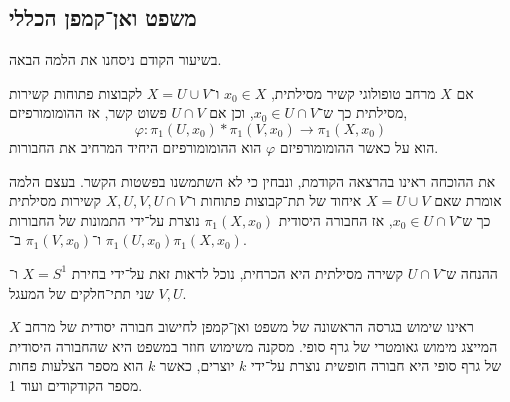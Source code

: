 \subsection{משפט ואן־קמפן הכללי}
בשיעור הקודם ניסחנו את הלמה הבאה.
\begin{lemma}
	אם $X$ מרחב טופולוגי קשיר מסילתית, $x_0 \in X$ ו־$X = U \cup V$ לקבוצות פתוחות קשירות מסילתית כך ש־$x_0 \in U \cap V$, וכן אם $U \cap V$ פשוט קשר, אז ההומומורפיזם,
	\[
		\varphi : \pi_1(U, x_0) * \pi_1(V, x_0) \to \pi_1(X, x_0)
	\]
	הוא על כאשר ההומומורפיזם $\varphi$ הוא ההומומורפיזם היחיד המרחיב את החבורות.
\end{lemma}
את ההוכחה ראינו בהרצאה הקודמת, ונבחין כי לא השתמשנו בפשטות הקשר.
בעצם הלמה אומרת שאם $X = U \cup V$ איחוד של תת־קבוצות פתוחות ו־$X, U, V, U \cap V$ קשירות מסילתית כך ש־$x_0 \in U \cap V$, אז החבורה היסודית $\pi_1(X, x_0)$ נוצרת על־ידי התמונות של החבורות
$\pi_1(U, x_0)$ ו־$\pi_1(V, x_0)$ ב־$\pi_1(X, x_0)$.
\begin{remark}
	ההנחה ש־$U \cap V$ קשירה מסילתית היא הכרחית, נוכל לראות זאת על־ידי בחירת $X = S^1$ ו־$V, U$ שני תתי־חלקים של המעגל.
\end{remark}
ראינו שימוש בגרסה הראשונה של משפט ואן־קמפן לחישוב חבורה יסודית של מרחב $X$ המייצג מימוש גאומטרי של גרף סופי.
מסקנה משימוש חוזר במשפט היא שהחבורה היסודית של גרף סופי היא חבורה חופשית נוצרת על־ידי $k$ יוצרים,
כאשר $k$ הוא מספר הצלעות פחות מספר הקודקודים ועוד 1.

\listoftheorems[title=הגדרות ומשפטים,ignoreall,show={theorem,definition},swapnumber,onlynamed={proposition}]


